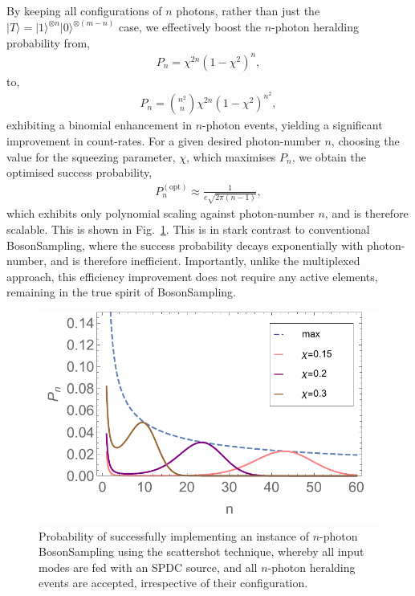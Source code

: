 \documentclass[aps, rmp, twocolumn, amsmath, amssymb, nofootinbib, superscriptaddress, longbibliography, floatfix, table-of-contents, eqsecnum]{revtex4-1}
\newcommand{\ket}[1]{|#1\rangle}
\begin{document}
By keeping all configurations of $n$ photons, rather than just the \mbox{$\ket{T}=\ket{1}^{\otimes n} \ket{0}^{\otimes (m-n)}$} case, we effectively boost the $n$-photon heralding probability from,
\begin{align}
	P_n = \chi^{2n}(1-\chi^2)^n,	
\end{align}
to,
\begin{align}
	P_n = \binom{n^2}{n}\chi^{2n}(1-\chi^2)^{n^2},	
\end{align}
exhibiting a binomial enhancement in $n$-photon events, yielding a significant improvement in count-rates. For a given desired photon-number $n$, choosing the value for the squeezing parameter, $\chi$, which maximises $P_n$, we obtain the optimised success probability,
\begin{align}
	P_n^{(\text{opt})} \approx \frac{1}{e\sqrt{2\pi(n-1)}},
\end{align}
which exhibits only polynomial scaling against photon-number $n$, and is therefore scalable. This is shown in Fig.~\ref{fig:scattershot_probs}. This is in stark contrast to conventional {\sc BosonSampling}, where the success probability decays exponentially with photon-number, and is therefore inefficient. Importantly, unlike the multiplexed approach, this efficiency improvement does not require any active elements, remaining in the true spirit of {\sc BosonSampling}.

\begin{figure}[!htb]
\includegraphics[width=\columnwidth]{scattershot_probs}
\caption{Probability of successfully implementing an instance of $n$-photon {\sc BosonSampling} using the scattershot technique, whereby all input modes are fed with an SPDC source, and all $n$-photon heralding events are accepted, irrespective of their configuration.} \label{fig:scattershot_probs}
\end{figure}
\end{document}
